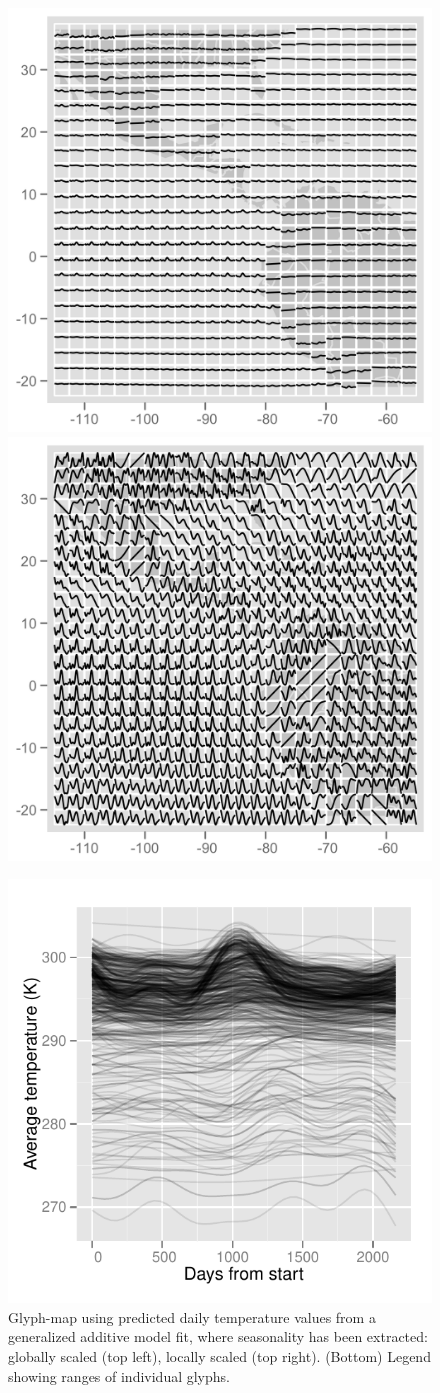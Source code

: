 \documentclass[oneside]{article}
\begin{document}
\begin{figure}[htbp]
  \centering
  \includegraphics[width=0.5\linewidth]{month-rescale-none}%
  \includegraphics[width=0.5\linewidth]{month-rescale01}

  \includegraphics[width=0.33\linewidth]{month-rescale-legend}

  \caption{Glyph-map using predicted daily temperature values from a generalized additive model fit, where seasonality has been extracted: globally scaled (top left), locally scaled (top right). (Bottom) Legend showing ranges of individual glyphs.}
  \label{fig:scaling}
\end{figure}
\end{document}
